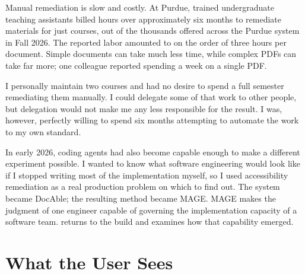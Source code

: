 Manual remediation is slow and costly. At Purdue, trained undergraduate teaching assistants billed  hours over approximately six months to remediate materials for just  courses, out of the thousands offered across the Purdue system in Fall 2026. The reported labor amounted to on the order of three hours per document. Simple documents can take much less time, while complex PDFs can take far more; one colleague reported spending a week on a single PDF\citep{davis2026docable}.

I personally maintain two courses and had no desire to spend a full semester remediating them manually. I could delegate some of that work to other people, but delegation would not make me any less responsible for the result. I was, however, perfectly willing to spend six months attempting to automate the work to my own standard.


In early 2026, coding agents had also become capable enough to make a different experiment possible. I wanted to know what software engineering would look like if I stopped writing most of the implementation myself, so I used accessibility remediation as a real production problem on which to find out. The system became DocAble; the resulting method became MAGE. MAGE makes the judgment of one engineer capable of governing the implementation capacity of a software team.  returns to the build and examines how that capability emerged.

\section{What the User Sees}\label{heading:what-the-user-sees}





